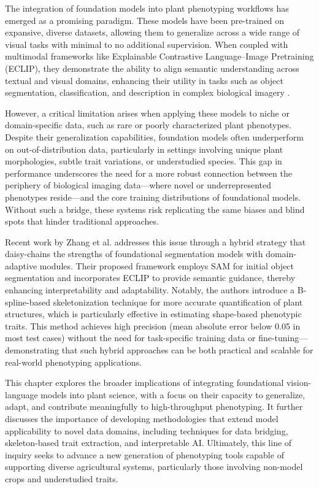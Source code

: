 \cite{Zhang2024}
The integration of foundation models into plant phenotyping workflows has emerged as a promising paradigm. These models have been pre-trained on expansive, diverse datasets, allowing them to generalize across a wide range of visual tasks with minimal to no additional supervision. When coupled with multimodal frameworks like Explainable Contrastive Language–Image Pretraining (ECLIP), they demonstrate the ability to align semantic understanding across textual and visual domains, enhancing their utility in tasks such as object segmentation, classification, and description in complex biological imagery \cite{Zhang2024}.

However, a critical limitation arises when applying these models to niche or domain-specific data, such as rare or poorly characterized plant phenotypes. Despite their generalization capabilities, foundation models often underperform on out-of-distribution data, particularly in settings involving unique plant morphologies, subtle trait variations, or understudied species. This gap in performance underscores the need for a more robust connection between the periphery of biological imaging data—where novel or underrepresented phenotypes reside—and the core training distributions of foundational models. Without such a bridge, these systems risk replicating the same biases and blind spots that hinder traditional approaches.

Recent work by Zhang et al. \cite{Zhang2024} addresses this issue through a hybrid strategy that daisy-chains the strengths of foundational segmentation models with domain-adaptive modules. Their proposed framework employs SAM for initial object segmentation and incorporates ECLIP to provide semantic guidance, thereby enhancing interpretability and adaptability. Notably, the authors introduce a B-spline-based skeletonization technique for more accurate quantification of plant structures, which is particularly effective in estimating shape-based phenotypic traits. This method achieves high precision (mean absolute error below 0.05 in most test cases) without the need for task-specific training data or fine-tuning—demonstrating that such hybrid approaches can be both practical and scalable for real-world phenotyping applications.

This chapter explores the broader implications of integrating foundational vision-language models into plant science, with a focus on their capacity to generalize, adapt, and contribute meaningfully to high-throughput phenotyping. It further discusses the importance of developing methodologies that extend model applicability to novel data domains, including techniques for data bridging, skeleton-based trait extraction, and interpretable AI. Ultimately, this line of inquiry seeks to advance a new generation of phenotyping tools capable of supporting diverse agricultural systems, particularly those involving non-model crops and understudied traits.



